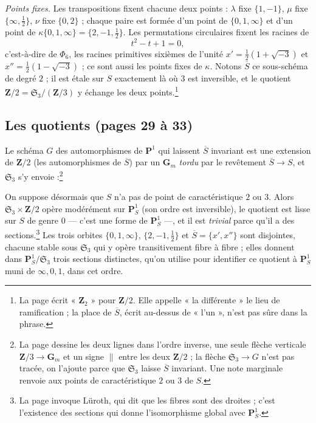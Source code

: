 \documentclass[11pt,a4paper]{article}
\begin{document}
\emph{Points fixes.} Les transpositions fixent chacune deux points :
$\lambda$ fixe $\{1, -1\}$, $\mu$ fixe $\{\infty, \frac12\}$, $\nu$ fixe $\{0,
2\}$ ; chaque paire est formée d'un point de $\{0, 1, \infty\}$ et d'un point
de $\kappa\{0, 1, \infty\} = \{2, -1, \frac12\}$. Les permutations circulaires
fixent les racines de
\[
t^2 - t + 1 = 0,
\]
c'est-à-dire de $\Phi_6$, les racines primitives sixièmes de l'unité $x' =
\frac12(1 + \sqrt{-3})$ et $x'' = \frac12(1 - \sqrt{-3})$ ; ce sont aussi les
points fixes de $\kappa$. Notons $\overline{S}$ ce sous-schéma de degré $2$ ;
il est étale sur $S$ exactement là où $3$ est inversible, et le quotient $\mathbf{Z}/2 = \mathfrak{S}_3/(\mathbf{Z}/3)$ y
échange les deux points.\footnote{La page écrit « $\mathbf{Z}_2$ » pour
$\mathbf{Z}/2$. Elle appelle « la différente » le lieu de ramification ; la
place de $\overline{S}$, écrit au-dessus de « l'un », n'est pas sûre dans la
phrase.}

\subsection*{Les quotients (pages 29 à 33)}

Le schéma $G$ des automorphismes de $\mathbf{P}^1$ qui laissent $\overline{S}$
invariant est une extension de $\mathbf{Z}/2$ (les automorphismes de
$\overline{S}$) par un $\mathbf{G}_m$ \emph{tordu} par le revêtement
$\overline{S} \to S$, et $\mathfrak{S}_3$ s'y envoie :\footnote{La page dessine les deux lignes dans l'ordre inverse, une seule
flèche verticale $\mathbf{Z}/3 \to \mathbf{G}_m$ et un signe $\|$ entre les
deux $\mathbf{Z}/2$ ; la flèche $\mathfrak{S}_3 \to G$ n'est pas tracée, on
l'ajoute parce que $\mathfrak{S}_3$ laisse $\overline{S}$ invariant. Une note
marginale renvoie aux points de caractéristique $2$ ou $3$ de $S$.}



On suppose désormais que $S$ n'a pas de point de caractéristique $2$ ou $3$.
Alors $\mathfrak{S}_3 \times \mathbf{Z}/2$ opère modérément sur
$\mathbf{P}^1_S$ (son ordre est inversible), le quotient est lisse sur $S$ de
genre $0$ --- c'est une forme de $\mathbf{P}^1_S$ ---, et il est
\emph{trivial} parce qu'il a des sections.\footnote{La page invoque Lüroth, qui
dit que les fibres sont des droites ; c'est l'existence des sections qui donne
l'isomorphisme global avec $\mathbf{P}^1_S$.} Les trois orbites
$\{0, 1, \infty\}$, $\{2, -1, \frac12\}$ et $\overline{S} = \{x', x''\}$ sont
disjointes, chacune stable sous $\mathfrak{S}_3$ qui y opère transitivement
fibre à fibre ; elles donnent dans $\mathbf{P}^1_S/\mathfrak{S}_3$ trois
sections distinctes, qu'on utilise pour identifier ce quotient à
$\mathbf{P}^1_S$ muni de $\infty, 0, 1$, dans cet ordre.
\end{document}

